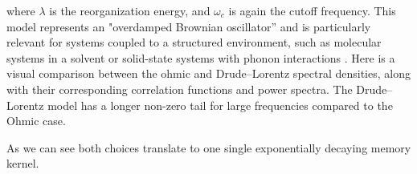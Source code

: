 \noindent
where $\lambda$ is the reorganization energy, and $\omega_c$ is again the cutoff frequency. This model represents an "overdamped Brownian oscillator” and is particularly relevant for systems coupled to a structured environment, such as molecular systems in a solvent or solid-state systems with phonon interactions .%
\noindent
Here is a visual comparison between the ohmic and Drude--Lorentz spectral densities, along with their corresponding correlation functions and power spectra. The Drude--Lorentz model has a longer non-zero tail for large frequencies compared to the Ohmic case.

\iffalse
	\begin{figure}[t]
		\centering
		\texttt{[image: bath\_comparison\_combined\_0.010\_100.00\_100.000.png]}
		\caption{Comparison of representative bath models (Ohmic and Drude--Lorentz) showing spectral densities, associated power spectra, and time-domain correlation functions for coupling strength $\alpha = 0.1$, cutoff $\omega_c = 100$, and temperature $T=100$. Distinct spectral shapes map directly onto different relaxation and dephasing behaviors.}
		\label{fig:bath_comparison}
	\end{figure}
	\begin{figure}
		\centering
		\texttt{[image: temperature\_analysis\_ohmic\_bath.png]}
		\caption{Temperature dependence of the bath correlation function for an Ohmic bath with $\alpha = 1$ and cutoff $\omega_c = 100$. Higher temperatures increase the amplitude and decrease the correlation time, reflecting enhanced thermal fluctuations.}
		\label{fig:bath_temperature_comparison}
	\end{figure}
\fi

\noindent
As we can see both choices translate to one single exponentially decaying memory kernel.

